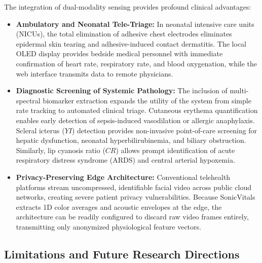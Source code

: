 \documentclass[journal]{IEEEtran}
\begin{document}
The integration of dual-modality sensing provides profound clinical advantages:
\begin{itemize}
    \item \textbf{Ambulatory and Neonatal Tele-Triage:} In neonatal intensive care units (NICUs), the total elimination of adhesive chest electrodes eliminates epidermal skin tearing and adhesive-induced contact dermatitis. The local OLED display provides bedside medical personnel with immediate confirmation of heart rate, respiratory rate, and blood oxygenation, while the web interface transmits data to remote physicians.
    \item \textbf{Diagnostic Screening of Systemic Pathology:} The inclusion of multi-spectral biomarker extraction expands the utility of the system from simple rate tracking to automated clinical triage. Cutaneous erythema quantification enables early detection of sepsis-induced vasodilation or allergic anaphylaxis. Scleral icterus ($YI$) detection provides non-invasive point-of-care screening for hepatic dysfunction, neonatal hyperbilirubinemia, and biliary obstruction. Similarly, lip cyanosis ratio ($CR$) allows prompt identification of acute respiratory distress syndrome (ARDS) and central arterial hypoxemia.
    \item \textbf{Privacy-Preserving Edge Architecture:} Conventional telehealth platforms stream uncompressed, identifiable facial video across public cloud networks, creating severe patient privacy vulnerabilities. Because SonicVitals extracts 1D color averages and acoustic envelopes at the edge, the architecture can be readily configured to discard raw video frames entirely, transmitting only anonymized physiological feature vectors.
\end{itemize}

\subsection{Limitations and Future Research Directions}
\end{document}
